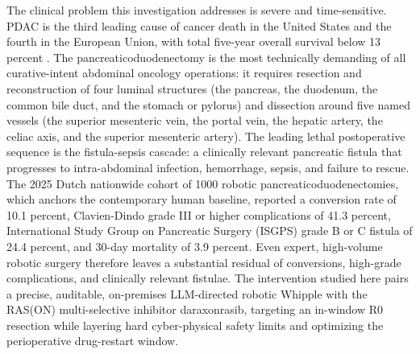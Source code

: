 The clinical problem this investigation addresses is severe and time-sensitive.
PDAC is the third leading cause of cancer death in the United States and the fourth
in the European Union, with total five-year overall survival below 13 percent
\cite{pdac060s2030}. The pancreaticoduodenectomy is the most technically demanding
of all curative-intent abdominal oncology operations: it requires resection and
reconstruction of four luminal structures (the pancreas, the duodenum, the common
bile duct, and the stomach or pylorus) and dissection around five named vessels
(the superior mesenteric vein, the portal vein, the hepatic artery, the celiac
axis, and the superior mesenteric artery). The leading lethal postoperative
sequence is the fistula-sepsis cascade: a clinically relevant pancreatic fistula
that progresses to intra-abdominal infection, hemorrhage, sepsis, and failure to
rescue. The 2025 Dutch nationwide cohort of 1000 robotic
pancreaticoduodenectomies, which anchors the contemporary human baseline, reported
a conversion rate of 10.1 percent, Clavien-Dindo grade III or higher complications
of 41.3 percent, International Study Group on Pancreatic Surgery (ISGPS) grade B or
C fistula of 24.4 percent, and 30-day mortality of 3.9 percent. Even expert,
high-volume robotic surgery therefore leaves a substantial residual of conversions,
high-grade complications, and clinically relevant fistulae. The intervention
studied here pairs a precise, auditable, on-premises LLM-directed robotic Whipple
with the RAS(ON) multi-selective inhibitor daraxonrasib, targeting an in-window R0
resection while layering hard cyber-physical safety limits and optimizing the
perioperative drug-restart window.

